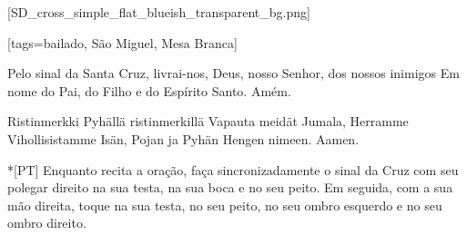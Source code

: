   [SD_cross_simple_flat_blueish_transparent_bg.png]
    \scleardpage
    \begin{songs}{}
      \renewcommand{\thesongnum}{\Roman{songnum}}
      \setcounter{songnum}{1}
      [tags={bailado, São Miguel, Mesa Branca}]
        \vspace*{\fill}
        \begin{passage}[PT]{}\obeylines
          Pelo sinal da Santa Cruz,
          livrai-nos, Deus, nosso Senhor,
          dos nossos inimigos
          \polpar
          Em nome do Pai, do Filho e do Espírito Santo.
          \polpar
          Amém.
        \end{passage}
        \vspace*{\fill}
        \begin{passage}[FI]{Ristinmerkki}\obeylines
          Pyhällä ristinmerkillä
          Vapauta meidät Jumala, Herramme
          Vihollisistamme
          \polpar
          Isän, Pojan ja Pyhän Hengen nimeen.
          \polpar
          Aamen.
        \end{passage}
        \vspace*{\fill}
        \hardbrk
        \vspace*{\fill}
        \begin{passage}*[PT]{}\obeylines
          Enquanto recita a oração, faça sincronizadamente
          o sinal da Cruz com seu polegar direito
          na sua testa,
          na sua boca e
          no seu peito.
          \polpar
          Em seguida, com a sua mão direita, toque
          na sua testa,
          no seu peito,
          no seu ombro esquerdo e no seu ombro direito.
        \end{passage}

\end{songs}
